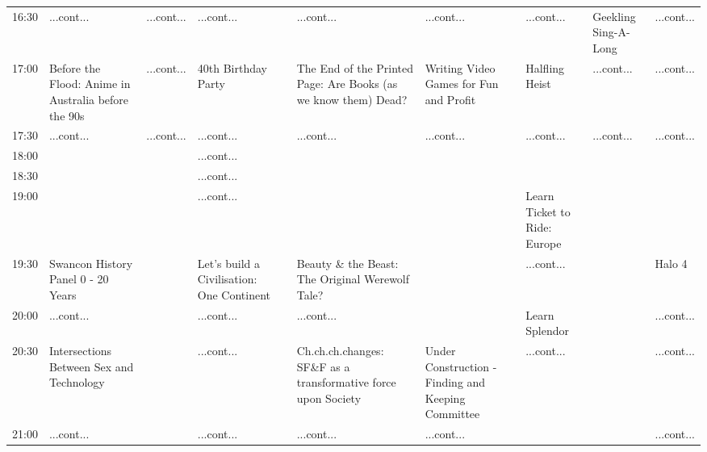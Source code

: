 \documentclass{scrreprt}
\begin{document}
\begin{landscape}
\begin{tabular}{c||p{25mm}|p{25mm}|p{25mm}|p{25mm}|p{25mm}|p{25mm}|p{25mm}|p{25mm}|p{25mm}|}
16:30&\cellcolor[gray]{0.506255} ...cont...&\cellcolor[gray]{0.625550} ...cont...&\cellcolor[gray]{0.733047} ...cont...&&\cellcolor[gray]{0.865034} ...cont...&\cellcolor[gray]{0.666507} ...cont...&\cellcolor[gray]{0.754827} ...cont...&\cellcolor[gray]{0.710118} Geekling Sing-A-Long&\cellcolor[gray]{0.616328} ...cont...\\
17:00&\cellcolor[gray]{0.526283} Before the Flood: Anime in Australia before the 90s&\cellcolor[gray]{0.625550} ...cont...&\cellcolor[gray]{0.545477} 40th Birthday Party&&\cellcolor[gray]{0.775339} The End of the Printed Page: Are Books (as we know them) Dead?&\cellcolor[gray]{0.918025} Writing Video Games for Fun and Profit&\cellcolor[gray]{0.986524} Halfling Heist&\cellcolor[gray]{0.710118} ...cont...&\cellcolor[gray]{0.616328} ...cont...\\
17:30&\cellcolor[gray]{0.526283} ...cont...&\cellcolor[gray]{0.625550} ...cont...&\cellcolor[gray]{0.545477} ...cont...&&\cellcolor[gray]{0.775339} ...cont...&\cellcolor[gray]{0.918025} ...cont...&\cellcolor[gray]{0.986524} ...cont...&\cellcolor[gray]{0.710118} ...cont...&\cellcolor[gray]{0.616328} ...cont...\\
18:00&&&\cellcolor[gray]{0.545477} ...cont...&&&&&&\\
18:30&&&\cellcolor[gray]{0.545477} ...cont...&&&&&&\\
19:00&&&\cellcolor[gray]{0.545477} ...cont...&&&&\cellcolor[gray]{0.745965} Learn Ticket to Ride: Europe&&\\
19:30&\cellcolor[gray]{0.791599} Swancon History Panel 0 - 20 Years&&\cellcolor[gray]{0.873067} Let's build a Civilisation: One Continent&&\cellcolor[gray]{0.851841} Beauty \& the Beast: The Original Werewolf Tale?&&\cellcolor[gray]{0.745965} ...cont...&&\cellcolor[gray]{0.645407} Halo 4\\
20:00&\cellcolor[gray]{0.791599} ...cont...&&\cellcolor[gray]{0.873067} ...cont...&&\cellcolor[gray]{0.851841} ...cont...&&\cellcolor[gray]{0.835125} Learn Splendor&&\cellcolor[gray]{0.645407} ...cont...\\
20:30&\cellcolor[gray]{0.504420} Intersections Between Sex and Technology&&\cellcolor[gray]{0.873067} ...cont...&&\cellcolor[gray]{0.820104} Ch.ch.ch.changes: SF\&F as a transformative force upon Society&\cellcolor[gray]{0.759747} Under Construction - Finding and Keeping Committee&\cellcolor[gray]{0.835125} ...cont...&&\cellcolor[gray]{0.645407} ...cont...\\
21:00&\cellcolor[gray]{0.504420} ...cont...&&\cellcolor[gray]{0.873067} ...cont...&&\cellcolor[gray]{0.820104} ...cont...&\cellcolor[gray]{0.759747} ...cont...&&&\cellcolor[gray]{0.645407} ...cont...\\

\end{tabular}
\end{landscape}
\end{document}
